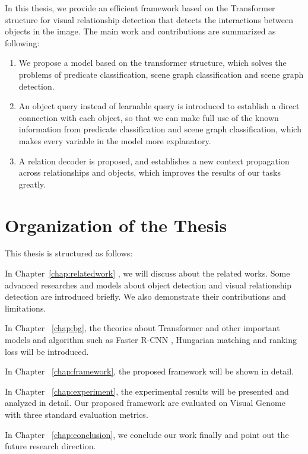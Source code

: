 In this thesis, we provide  an efficient framework based on the  Transformer structure  for visual relationship detection that detects the interactions between objects in the image. The main work and contributions are summarized as following:
\begin{enumerate}[\qquad  1.]
	\item We propose a model based on the transformer structure, which solves the problems of predicate classification, scene graph classification and scene graph detection.
	\item An object query instead of learnable query is introduced to establish a direct connection with each object, so that we can make full use of the known information from predicate classification and scene graph classification, which makes every variable in the model more explanatory.
	\item A relation decoder is proposed, and establishes a new context propagation across relationships and objects, which improves the results of our tasks greatly.
\end{enumerate}


\section{Organization of the Thesis}
This thesis is structured as follows:

In Chapter~\ref{chap:relatedwork} , we will discuss about the related works. Some advanced researches and models about object detection and visual relationship detection are introduced briefly. We also demonstrate their contributions and limitations.

In Chapter ~\ref{chap:bg}, the theories about Transformer and other important models and algorithm such as Faster R-CNN , Hungarian matching and ranking loss  will be introduced.

In Chapter ~\ref{chap:framework}, the proposed framework will be shown in detail.

In Chapter ~\ref{chap:experiment}, the experimental results will be presented and analyzed in detail. Our proposed framework are evaluated on Visual Genome with three standard evaluation metrics.

In Chapter ~\ref{chap:conclusion}, we conclude our work finally and point out the future research direction.